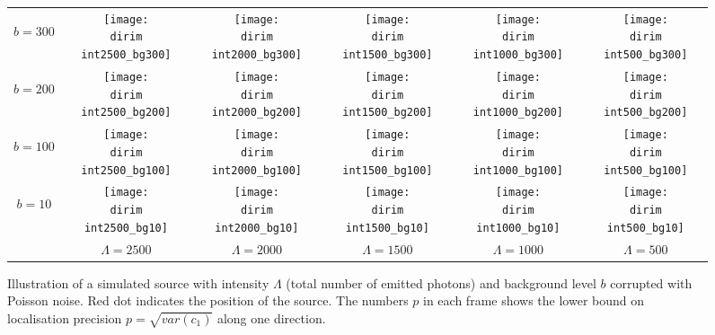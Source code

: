 \clearpage
\begin{figure}[!bt]
	\centering
	\newcommand{\wf}{.15\textwidth}
	\newcommand{\dirim}{\qd gFREM/images/psf2/text_}
	\newcommand{\vs}{.4}
	\begin{tabular}{c|ccccc}
		\begin{sideways}\hspace{\vs cm}$b=300$\end{sideways}
		&\texttt{[image: \\dirim int2500\_bg300]}
		&\texttt{[image: \\dirim int2000\_bg300]}
		&\texttt{[image: \\dirim int1500\_bg300]}
		&\texttt{[image: \\dirim int1000\_bg300]}
		&\texttt{[image: \\dirim int500\_bg300]}\\
		\begin{sideways}\hspace{\vs cm}$b=200$\end{sideways}
		&\texttt{[image: \\dirim int2500\_bg200]}
		&\texttt{[image: \\dirim int2000\_bg200]}
		&\texttt{[image: \\dirim int1500\_bg200]}
		&\texttt{[image: \\dirim int1000\_bg200]}
		&\texttt{[image: \\dirim int500\_bg200]}\\
		\begin{sideways}\hspace{\vs cm}$b=100$\end{sideways}
		&\texttt{[image: \\dirim int2500\_bg100]}
		&\texttt{[image: \\dirim int2000\_bg100]}
		&\texttt{[image: \\dirim int1500\_bg100]}
		&\texttt{[image: \\dirim int1000\_bg100]}
		&\texttt{[image: \\dirim int500\_bg100]}\\
		\begin{sideways}\hspace{\vs cm}$b=10$\end{sideways}
		&\texttt{[image: \\dirim int2500\_bg10]}
		&\texttt{[image: \\dirim int2000\_bg10]}
		&\texttt{[image: \\dirim int1500\_bg10]}
		&\texttt{[image: \\dirim int1000\_bg10]}
		&\texttt{[image: \\dirim int500\_bg10]}\\
		\hline
		&$\Lambda=2500$ & $\Lambda=2000$ & $\Lambda=1500$ & $\Lambda=1000$ & $\Lambda=500$\\
	\end{tabular}
	\caption{Illustration of a simulated source with intensity $\Lambda$ (total number of emitted photons) and background level $b$ corrupted with Poisson noise. Red dot indicates the position of the source. The numbers $p$ in each frame shows the lower bound on localisation precision $p=\sqrt{var(c_1)}$ along one direction.}
	\label{fig:PSF int bg}
\end{figure}
